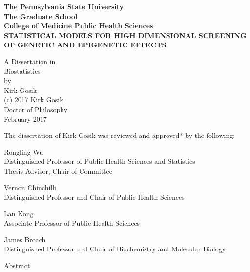 \documentclass[11pt,]{book}
\title{}
\author{}
\date{}
\theoremstyle{definition}
\theoremstyle{definition}
\theoremstyle{remark}
\begin{document}
\begin{center}
\begin{titlepage}
\bf{The Pennsylvania State University} \\
The Graduate School \\
College of Medicine Public Health Sciences \\

STATISTICAL MODELS FOR HIGH DIMENSIONAL SCREENING OF GENETIC AND EPIGENETIC EFFECTS

A Dissertation in \\
Biostatistics \\
by \\
Kirk Gosik \\
(c) 2017 Kirk Gosik \\

Doctor of Philosophy \\
February 2017 \\
\end{titlepage}
\newpage
{}
\setcounter{page}{2}
The dissertation of Kirk Gosik was reviewed and approved* by the following:

Rongling Wu \\
Distinguished Professor of Public Health Sciences and Statistics \\
Thesis Advisor, Chair of Committee

Vernon Chinchilli \\
Distinguished Professor and Chair of Public Health Sciences


Lan Kong \\
Associate Professor of Public Health Sciences

James Broach \\
Distinguished Professor and Chair of Biochemistry and Molecular Biology \\


\newpage

Abstract


\end{center}
\end{document}
